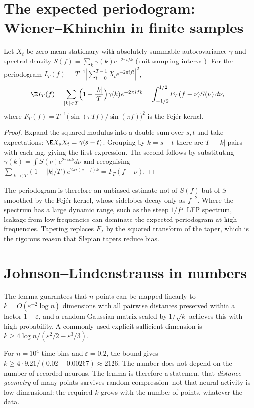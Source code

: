 \section{The expected periodogram: Wiener--Khinchin in finite samples}
Let $X_t$ be zero-mean stationary with absolutely summable autocovariance
$\gamma$ and spectral density $S(f)=\sum_k\gamma(k)e^{-2\pi ifk}$ (unit
sampling interval). For the periodogram
$I_T(f)=T^{-1}|\sum_{t=0}^{T-1}X_te^{-2\pi ift}|^2$,
\[
\E I_T(f)=\sum_{|k|<T}\Bigl(1-\frac{|k|}T\Bigr)\gamma(k)e^{-2\pi ifk}
=\int_{-1/2}^{1/2}F_T(f-\nu)S(\nu)\,d\nu,
\]
where $F_T(f)=T^{-1}\bigl(\sin(\pi Tf)/\sin(\pi f)\bigr)^2$ is the Fej\'er kernel.
\begin{proof}
Expand the squared modulus into a double sum over $s,t$ and take
expectations: $\E X_s X_t=\gamma(s-t)$. Grouping by $k=s-t$ there are
$T-|k|$ pairs with each lag, giving the first expression. The second
follows by substituting $\gamma(k)=\int S(\nu)e^{2\pi i\nu k}d\nu$ and
recognising $\sum_{|k|<T}(1-|k|/T)e^{2\pi i(\nu-f)k}=F_T(f-\nu)$.
\end{proof}
The periodogram is therefore an unbiased estimate not of $S(f)$ but of
$S$ smoothed by the Fej\'er kernel, whose sidelobes decay only as
$f^{-2}$. Where the spectrum has a large dynamic range, such as the steep
$1/f^\chi$ LFP spectrum, leakage from low frequencies can dominate the
expected periodogram at high frequencies. Tapering replaces $F_T$ by the
squared transform of the taper, which is the rigorous reason that
Slepian tapers reduce bias.

\section{Johnson--Lindenstrauss in numbers}
The lemma guarantees that $n$ points can be mapped linearly to
$k=O(\varepsilon^{-2}\log n)$ dimensions with all pairwise distances
preserved within a factor $1\pm\varepsilon$, and a random Gaussian matrix
scaled by $1/\sqrt k$ achieves this with high probability. A commonly
used explicit sufficient dimension is
$k\ge4\log n/(\varepsilon^2/2-\varepsilon^3/3)$.
\begin{example}
For $n=10^4$ time bins and $\varepsilon=0.2$, the bound gives
$k\ge4\cdot9.21/(0.02-0.00267)\approx2126$. The number does not depend on
the number of recorded neurons. The lemma is therefore a statement that
\emph{distance geometry} of many points survives random compression,
not that neural activity is low-dimensional: the required $k$ grows with
the number of points, whatever the data.
\end{example}

